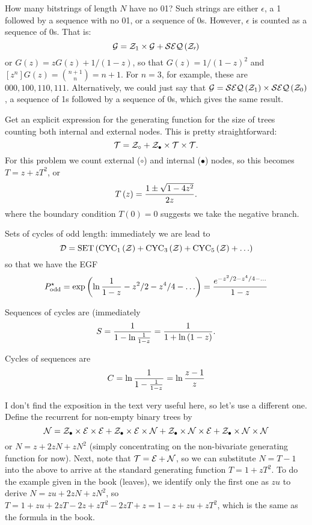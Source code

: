 \vskip 0.08in  How many bitstrings of
length $N$ have no 01?\hfil\break
Such strings are either $\epsilon$, a 1 followed by a sequence with no 01,
or a sequence of 0s.  However, $\epsilon$ is counted as a sequence of 0s. That is:
$$
 {\cal G} = {\cal Z}_1 \times {\cal G} + {\cal SEQ}\left({\cal Z_0}\right)
$$
or $G\left(z\right) = z G\left(z\right) + 1 /\left( 1 - z \right) $, so that
$G\left(z\right) = 1 / \left(1 - z\right)^2$ and $\left[z^n\right] G\left(z\right) =
{n + 1 \choose n} = n + 1$.  For $n=3$, for example, these are
$000, 100, 110, 111$.  Alternatively, we could just say that
${\cal G} = {\cal SEQ}\left({\cal Z}_1\right) \times {\cal SEQ}\left({\cal Z}_0\right)$,
a sequence of 1s followed by a sequence of 0s, which gives the same result.

\vskip 0.08in  Get an explicit expression for the 
generating function for the size of trees counting both internal and external nodes.
This is pretty straightforward: 
$$
 {\cal T} = {\cal Z}_{\circ} + {\cal Z}_{\bullet} \times {\cal T} \times {\cal T}.
$$
For this problem we count external ($\circ$) and internal ($\bullet$) nodes,
so this becomes $T = z + z T^2$, or
$$
 T\left(z\right) = {1 \pm \sqrt{1 - 4 z^2} \over 2 z}.
$$
where the boundary condition $T\left(0\right) = 0$ suggests we take the negative branch.

\vskip 0.08in  Sets of cycles of odd length:
immediately we are lead to 
$$
{\cal D} = {\rm SET} \left(
{\rm CYC}_1\left({\cal Z}\right) + {\rm CYC}_3 \left({\cal Z}\right) +
 {\rm CYC}_5 \left({\cal Z}\right) + \ldots \right)
 $$
 so that we have the EGF
 $$
 P^{\star}_{\rm odd} = \exp \left( \ln {1 \over 1 - z } - z^2/2 - z^4/4 - \ldots\right)
  = { e^{-z^2/2 - z^4/4 - \ldots} \over 1 - z }
$$

\vskip 0.08in  Sequences of cycles are (immediately
$$
  S = {1 \over {1 - \ln {1 \over 1 - z}}} = {1 \over 1 + \ln \left(1 - z\right)}.
$$

\vskip 0.08in  Cycles of sequences are
$$
 C = \ln {1 \over {1 - {1 \over 1 - z}}} = \ln {z - 1 \over z}
$$

\vskip 0.08in  I don't find the exposition in the
text very useful here, so let's use a different one.  Define the recurrent for
non-empty binary trees by
$$
 {\cal N} = {\cal Z}_{\bullet} \times {\cal E} \times {\cal E}
 + {\cal Z}_{\bullet} \times {\cal E} \times {\cal N}
 + {\cal Z}_{\bullet} \times {\cal N} \times {\cal E}
 + {\cal Z}_{\bullet} \times {\cal N} \times {\cal N}
$$
or $N = z + 2 z N + z N^2$ (simply concentrating on the non-bivariate
generating function for now).  Next, note that ${\cal T} = {\cal E} + {\cal N}$,
so we can substitute $N = T - 1$ into the above to arrive at the standard
generating function $T = 1 + z T^2$.  To do the example given in the book
(leaves), we identify only the first one as $z u$ to derive
$N = z u + 2 z N + z N^2$, so $T = 1 + zu + 2 z T - 2z + z T^2 - 2 z T + z =
1 - z + z u + z T^2$, which is the same as the formula in the book.

